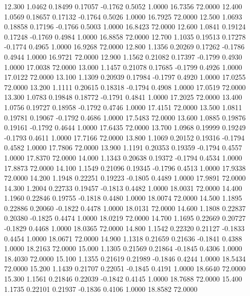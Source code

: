   12.300   1.0462   0.18499   0.17057  -0.1762   0.5052   1.0000  16.7356  72.0000
  12.400   1.0569   0.18657   0.17132  -0.1764   0.5026   1.0000  16.7925  72.0000
  12.500   1.0693   0.18858   0.17196  -0.1766   0.5003   1.0000  16.8423  72.0000
  12.600   1.0841   0.19124   0.17248  -0.1769   0.4984   1.0000  16.8858  72.0000
  12.700   1.1035   0.19513   0.17278  -0.1774   0.4965   1.0000  16.9268  72.0000
  12.800   1.1356   0.20269   0.17262  -0.1786   0.4944   1.0000  16.9721  72.0000
  12.900   1.1562   0.21082   0.17397  -0.1799   0.4930   1.0000  17.0038  72.0000
  13.000   1.1457   0.21078   0.17685  -0.1799   0.4926   1.0000  17.0122  72.0000
  13.100   1.1309   0.20939   0.17984  -0.1797   0.4920   1.0000  17.0255  72.0000
  13.200   1.1111   0.20615   0.18318  -0.1794   0.4908   1.0000  17.0519  72.0000
  13.300   1.0783   0.19848   0.18772  -0.1791   0.4841   1.0000  17.2025  72.0000
  13.400   1.0756   0.19727   0.18958  -0.1792   0.4746   1.0000  17.4151  72.0000
  13.500   1.0811   0.19781   0.19067  -0.1792   0.4686   1.0000  17.5483  72.0000
  13.600   1.0885   0.19876   0.19161  -0.1792   0.4644   1.0000  17.6435  72.0000
  13.700   1.0968   0.19999   0.19249  -0.1793   0.4611   1.0000  17.7166  72.0000
  13.800   1.1069   0.20152   0.19316  -0.1794   0.4582   1.0000  17.7806  72.0000
  13.900   1.1191   0.20353   0.19359  -0.1794   0.4557   1.0000  17.8370  72.0000
  14.000   1.1343   0.20638   0.19372  -0.1794   0.4534   1.0000  17.8873  72.0000
  14.100   1.1549   0.21096   0.19345  -0.1796   0.4513   1.0000  17.9338  72.0000
  14.200   1.1948   0.22251   0.19223  -0.1805   0.4489   1.0000  17.9891  72.0000
  14.300   1.2004   0.22733   0.19457  -0.1813   0.4482   1.0000  18.0031  72.0000
  14.400   1.1960   0.22846   0.19755  -0.1818   0.4480   1.0000  18.0074  72.0000
  14.500   1.1895   0.22886   0.20060  -0.1822   0.4478   1.0000  18.0131  72.0000
  14.600   1.1808   0.22837   0.20380  -0.1825   0.4474   1.0000  18.0219  72.0000
  14.700   1.1695   0.22669   0.20727  -0.1829   0.4468   1.0000  18.0365  72.0000
  14.800   1.1542   0.22320   0.21127  -0.1833   0.4454   1.0000  18.0671  72.0000
  14.900   1.1318   0.21659   0.21636  -0.1841   0.4388   1.0000  18.2163  72.0000
  15.000   1.1305   0.21569   0.21864  -0.1845   0.4306   1.0000  18.4030  72.0000
  15.100   1.1355   0.21619   0.21989  -0.1846   0.4244   1.0000  18.5434  72.0000
  15.200   1.1439   0.21707   0.22051  -0.1845   0.4191   1.0000  18.6640  72.0000
  15.300   1.1561   0.21846   0.22039  -0.1842   0.4145   1.0000  18.7688  72.0000
  15.400   1.1735   0.22101   0.21937  -0.1836   0.4106   1.0000  18.8582  72.0000
